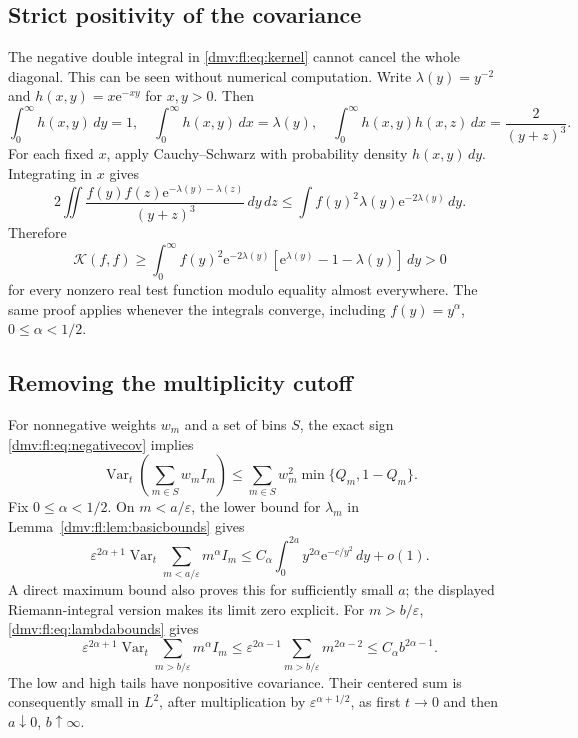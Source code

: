 \documentclass[11pt,letterpaper]{article}
\numberwithin{equation}{section}
\theoremstyle{definition}\newtheorem{definition}[theorem]{Definition}
\theoremstyle{remark}\newtheorem{remark}[theorem]{Remark}
\newcommand{\ee}{\mathrm e}
\newcommand{\eps}{\varepsilon}
\DeclareMathOperator{\Var}{Var}
\begin{document}
\subsection{Strict positivity of the covariance}
The negative double integral in \eqref{dmv:fl:eq:kernel} cannot cancel the
whole diagonal. This can be seen without numerical computation.
Write $\lambda(y)=y^{-2}$ and $h(x,y)=x\ee^{-xy}$ for $x,y>0$.
Then
\[
 \int_0^\infty h(x,y)\,dy=1,\quad
 \int_0^\infty h(x,y)\,dx=\lambda(y),\quad
 \int_0^\infty h(x,y)h(x,z)\,dx=\frac2{(y+z)^3}.
\]
For each fixed $x$, apply Cauchy--Schwarz with probability density
$h(x,y)\,dy$. Integrating in $x$ gives
\[
 2\iint\frac{f(y)f(z)\ee^{-\lambda(y)-\lambda(z)}}{(y+z)^3}\,dy\,dz
 \le\int f(y)^2\lambda(y)\ee^{-2\lambda(y)}\,dy.
\]
Therefore
\begin{equation}\label{dmv:fl:eq:strictpositive}
 \mathcal K(f,f)\ge
 \int_0^\infty f(y)^2\ee^{-2\lambda(y)}
       [\ee^{\lambda(y)}-1-\lambda(y)]\,dy>0
\end{equation}
for every nonzero real test function modulo equality almost everywhere.
The same proof applies whenever the integrals converge, including
$f(y)=y^\alpha$, $0\le\alpha<1/2$.

\subsection{Removing the multiplicity cutoff}
For nonnegative weights $w_m$ and a set of bins $S$, the exact sign
\eqref{dmv:fl:eq:negativecov} implies
\begin{equation}\label{dmv:fl:eq:tailvariance}
 \Var_t\left(\sum_{m\in S}w_mI_m\right)
 \le\sum_{m\in S}w_m^2\min\{Q_m,1-Q_m\}.
\end{equation}
Fix $0\le\alpha<1/2$. On $m<a/\eps$, the lower bound for $\lambda_m$
in Lemma~\ref{dmv:fl:lem:basicbounds} gives
\begin{equation}\label{dmv:fl:eq:lowweightedtail}
 \eps^{2\alpha+1}\Var_t\sum_{m<a/\eps}m^\alpha I_m
 \le C_\alpha\int_0^{2a}y^{2\alpha}\ee^{-c/y^2}\,dy+o(1).
\end{equation}
A direct maximum bound also proves this for sufficiently small $a$;
the displayed Riemann-integral version makes its limit zero explicit.
For $m>b/\eps$, \eqref{dmv:fl:eq:lambdabounds} gives
\begin{equation}\label{dmv:fl:eq:highweightedtail}
 \eps^{2\alpha+1}\Var_t\sum_{m>b/\eps}m^\alpha I_m
 \le\eps^{2\alpha-1}\sum_{m>b/\eps}m^{2\alpha-2}
 \le C_\alpha b^{2\alpha-1}.
\end{equation}
The low and high tails have nonpositive covariance. Their centered sum
is consequently small in $L^2$, after multiplication by
$\eps^{\alpha+1/2}$, as first $t\to0$ and then $a\downarrow0$,
$b\uparrow\infty$.
\end{document}
